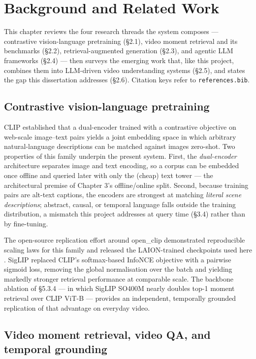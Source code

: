 \chapter{Background and Related Work}

This chapter reviews the four research threads the system composes ---
contrastive vision-language pretraining (§2.1), video moment retrieval
and its benchmarks (§2.2), retrieval-augmented generation (§2.3), and
agentic LLM frameworks (§2.4) --- then surveys the emerging work that,
like this project, combines them into LLM-driven video understanding
systems (§2.5), and states the gap this dissertation addresses (§2.6).
Citation keys refer to \texttt{references.bib}.

\section{Contrastive vision-language
pretraining}

CLIP \autocite{radford2021clip} established that a dual-encoder trained
with a contrastive objective on web-scale image--text pairs yields a
joint embedding space in which arbitrary natural-language descriptions
can be matched against images zero-shot. Two properties of this family
underpin the present system. First, the \emph{dual-encoder} architecture
separates image and text encoding, so a corpus can be embedded once
offline and queried later with only the (cheap) text tower --- the
architectural premise of Chapter 3's offline/online split. Second,
because training pairs are alt-text captions, the encoders are strongest
at matching \emph{literal scene descriptions}; abstract, causal, or
temporal language falls outside the training distribution, a mismatch
this project addresses at query time (§3.4) rather than by fine-tuning.

The open-source replication effort around open\_clip demonstrated
reproducible scaling laws for this family and released the LAION-trained
checkpoints used here \autocite{schuhmann2022laion,cherti2023openclip}.
SigLIP \autocite{zhai2023siglip} replaced CLIP's softmax-based InfoNCE
objective with a pairwise sigmoid loss, removing the global
normalisation over the batch and yielding markedly stronger retrieval
performance at comparable scale. The backbone ablation of §5.3.4 --- in
which SigLIP SO400M nearly doubles top-1 moment retrieval over CLIP
ViT-B --- provides an independent, temporally grounded replication of
that advantage on everyday video.

\section{Video moment retrieval, video QA, and temporal
grounding}

